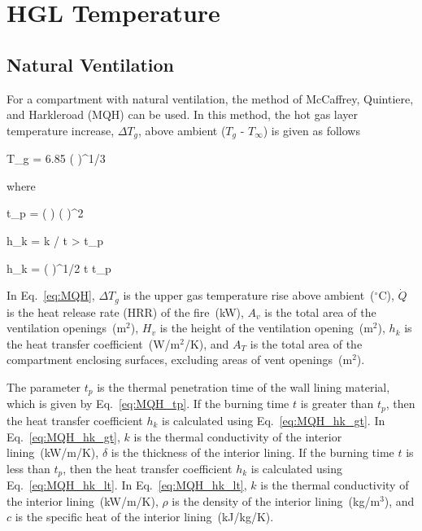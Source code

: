 
\chapter{HGL Temperature}
\label{HGL_Chapter}

\section{Natural Ventilation}

For a compartment with natural ventilation, the method of McCaffrey, Quintiere, and Harkleroad (MQH) can be used. In this method, the hot gas layer temperature increase, $\Delta T_g$, above ambient ($T_g$ - $T_\infty$) is given as follows

\be
\Delta T_g = 6.85 \left(  \right)^{1/3}
\label{eq:MQH}
\ee

\noindent where

\be
t_p = \left(  \right) \left(  \right)^2
\label{eq:MQH_tp}
\ee

\be
h_k = k / \delta {} t > t_p
\label{eq:MQH_hk_gt}
\ee

\be
h_k = \left(  \right)^{1/2}  t \le t_p
\label{eq:MQH_hk_lt}
\ee

In Eq.~\ref{eq:MQH}, $\Delta T_g$ is the upper gas temperature rise above ambient~($^\circ$C), $\dot Q$ is the heat release rate (HRR) of the fire~(kW), $A_v$ is the total area of the ventilation openings~(m$^2$), $H_v$ is the height of the ventilation opening~(m$^2$), $h_k$ is the heat transfer coefficient~(W/m$^2$/K), and $A_T$ is the total area of the compartment enclosing surfaces, excluding areas of vent openings~(m$^2$). 

The parameter $t_p$ is the thermal penetration time of the wall lining material, which is given by Eq.~\ref{eq:MQH_tp}. If the burning time $t$ is greater than $t_p$, then the heat transfer coefficient $h_k$ is calculated using Eq.~\ref{eq:MQH_hk_gt}. In Eq.~\ref{eq:MQH_hk_gt}, $k$ is the thermal conductivity of the interior lining~(kW/m/K), $\delta$ is the thickness of the interior lining. If the burning time $t$ is less than $t_p$, then the heat transfer coefficient $h_k$ is calculated using Eq.~\ref{eq:MQH_hk_lt}. In Eq.~\ref{eq:MQH_hk_lt}, $k$ is the thermal conductivity of the interior lining~(kW/m/K), $\rho$ is the density of the interior lining~(kg/m$^3$), and $c$ is the specific heat of the interior lining~(kJ/kg/K).

